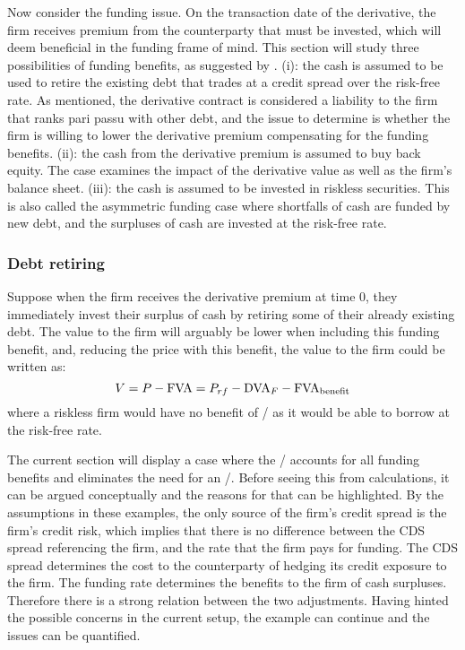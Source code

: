 \documentclass[../main.tex]{subfiles}
\begin{document}
        Now consider the funding issue. On the transaction date of the derivative, 
        the firm receives premium from the counterparty that must be invested, 
        which will deem beneficial in the funding frame of mind. 
        This section will study three possibilities of funding benefits, 
        as suggested by \textcite{Hillion2016}.
        (i): the cash is assumed to be used to retire the existing debt 
        that trades at a credit spread over the risk-free rate. 
        As mentioned, the derivative contract is considered a liability to the firm
        that ranks pari passu with other debt, 
        and the issue to determine is whether the firm is willing to lower the derivative premium 
        compensating for the funding benefits. 
        (ii): the cash from the derivative premium is assumed to buy back equity. 
        The case examines the impact of the derivative value as well as the firm's balance sheet. 
        (iii): the cash is assumed to be invested in riskless securities. 
        This is also called the asymmetric funding case where shortfalls of cash are funded by new debt, 
        and the surpluses of cash are invested at the risk-free rate.

        \subsubsection{Debt retiring}
            Suppose when the firm receives the derivative premium at time 0, 
            they immediately invest their surplus of cash by retiring some of their already existing debt. 
            The value to the firm will arguably be lower when including this funding benefit, 
            and, reducing the price with this benefit, the value to the firm could be written as:
            \begin{equation}
                V = P - \FVA/ = P_{rf} - \DVA/_F - \FBA/
            \end{equation}
            where a riskless firm would have no benefit of \FVA/ as it would be able to borrow at the risk-free rate.
            
            The current section will display a case where the \DVA/
            accounts for all funding benefits and eliminates the need for an \FVA/.
            Before seeing this from calculations, it can be argued conceptually
            and the reasons for that can be highlighted.
            By the assumptions in these examples,
            the only source of the firm's credit spread is the firm's credit risk, 
            which implies that there is no difference between the CDS spread referencing the firm,
            and the rate that the firm pays for funding.
            The CDS spread determines the cost to the counterparty 
            of hedging its credit exposure to the firm.
            The funding rate determines the benefits to the firm of cash surpluses.
            Therefore there is a strong relation between the two adjustments.
            Having hinted the possible concerns in the current setup, 
            the example can continue and the issues can be quantified.
\end{document}
